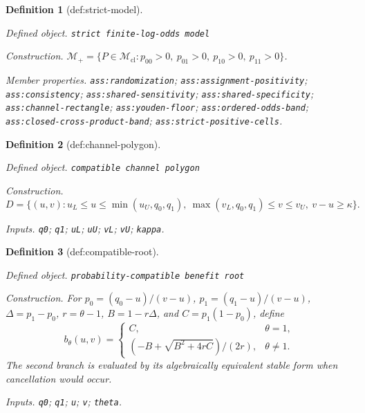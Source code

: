 \documentclass{article}
\newtheorem{definition}{Definition}
\begin{document}
\begin{definition}[def:strict-model]\label{def:strict-model}
\par\smallskip\noindent\emph{Defined object.} \texttt{strict finite-\allowbreak{}log-\allowbreak{}odds model}
\par\smallskip\noindent\emph{Construction.} \(\mathcal M_{+}=\{P\in\mathcal M_{\mathrm{cl}}:p_{00}>0,\ p_{01}>0,\ p_{10}>0,\ p_{11}>0\}\).
\par\smallskip\noindent\emph{Member properties.} \texttt{ass:\allowbreak{}randomization}; \texttt{ass:\allowbreak{}assignment-\allowbreak{}positivity}; \texttt{ass:\allowbreak{}consistency}; \texttt{ass:\allowbreak{}shared-\allowbreak{}sensitivity}; \texttt{ass:\allowbreak{}shared-\allowbreak{}specificity}; \texttt{ass:\allowbreak{}channel-\allowbreak{}rectangle}; \texttt{ass:\allowbreak{}youden-\allowbreak{}floor}; \texttt{ass:\allowbreak{}ordered-\allowbreak{}odds-\allowbreak{}band}; \texttt{ass:\allowbreak{}closed-\allowbreak{}cross-\allowbreak{}product-\allowbreak{}band}; \texttt{ass:\allowbreak{}strict-\allowbreak{}positive-\allowbreak{}cells}.
\end{definition}

\begin{definition}[def:channel-polygon]\label{def:channel-polygon}
\par\smallskip\noindent\emph{Defined object.} \texttt{compatible channel polygon}
\par\smallskip\noindent\emph{Construction.} \[D=\{(u,v):u_L\le u\le\min(u_U,q_0,q_1),\ \max(v_L,q_0,q_1)\le v\le v_U,\ v-u\ge\kappa\}.\]
\par\smallskip\noindent\emph{Inputs.} \texttt{q0}; \texttt{q1}; \texttt{uL}; \texttt{uU}; \texttt{vL}; \texttt{vU}; \texttt{kappa}.
\end{definition}

\begin{definition}[def:compatible-root]\label{def:compatible-root}
\par\smallskip\noindent\emph{Defined object.} \texttt{probability-\allowbreak{}compatible benefit root}
\par\smallskip\noindent\emph{Construction.} For \(p_0=(q_0-u)/(v-u)\), \(p_1=(q_1-u)/(v-u)\), \(\Delta=p_1-p_0\), \(r=\theta-1\), \(B=1-r\Delta\), and \(C=p_1(1-p_0)\), define \[b_{\theta}(u,v)=\begin{cases}C,&\theta=1,\\(-B+\sqrt{B^2+4rC})/(2r),&\theta\ne1.\end{cases}\] The second branch is evaluated by its algebraically equivalent stable form when cancellation would occur.
\par\smallskip\noindent\emph{Inputs.} \texttt{q0}; \texttt{q1}; \texttt{u}; \texttt{v}; \texttt{theta}.
\end{definition}
\end{document}
